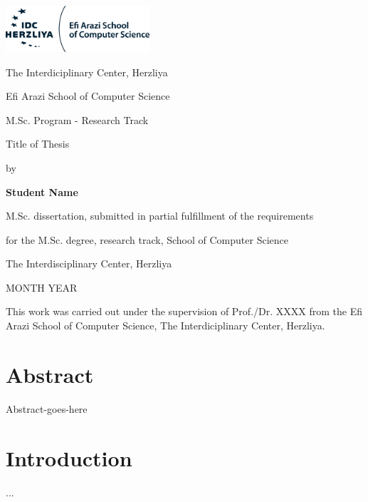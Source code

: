 \documentclass[12pt]{article}
\begin{document}
\begin{titlepage}
	\centering
	\includegraphics[width=0.4\textwidth]{IDC_logo}\par\vspace{2cm}
	{\huge The Interdiciplinary Center, Herzliya \par}
	{\Large Efi Arazi School of Computer Science \par}
	{\Large M.Sc. Program - Research Track \par}
	
	\vspace{1cm}
	
	\vspace{1.5cm}
	{\Huge Title of Thesis\par}
	\vspace{3cm}
	{\large by\par}
	{\large\bfseries Student Name\par}
	
	\vspace{2cm}
	{M.Sc. dissertation, submitted in partial fulfillment of the requirements\par}
	{for the M.Sc. degree, research track, School of Computer Science\par}
	{The Interdisciplinary Center, Herzliya}
	
	\vfill
	
	{\large MONTH YEAR\par}
	
\end{titlepage}

\newpage

This work was carried out under the supervision of Prof./Dr. XXXX from the Efi Arazi School of Computer Science, The	Interdiciplinary Center, Herzliya.

\newpage

\section*{Abstract}
Abstract-goes-here	


\newpage

\tableofcontents

\newpage

\section{Introduction}
...
\end{document}
